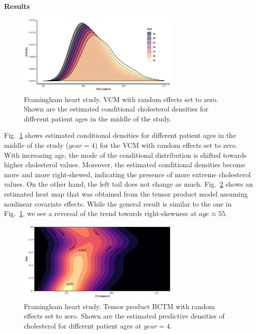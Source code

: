 \documentclass[12pt]{article}
\theoremstyle{plain}
\begin{document}
\noindent\textbf{Results}
\begin{figure}
\centering
   \hspace*{-1.5cm}\includegraphics[width=0.7\textwidth]{figs/fram_densities_vcm2.pdf}\caption{\small Framingham heart study. VCM with random effects set to zero. Shown are the estimated conditional cholesterol densities for different patient ages in the middle of the study.}\label{fig:fram3}
\end{figure}
Fig.~\ref{fig:fram3} shows estimated conditional densities for different patient ages in the middle of the study ($\mathit{year} = 4$) for the VCM with random effects set to zero. With increasing age, the mode of the conditional distribution is shifted towards higher cholesterol values. Moreover, the estimated conditional densities become more and more right-skewed, indicating the presence of more extreme cholesterol values. On the other hand, the left tail does not change as  much. Fig.~\ref{fig:fram4} shows an estimated heat map that was obtained from the tensor product model assuming nonlinear covariate effects. While the general result is similar to the one in Fig.~\ref{fig:fram3}, we see a reversal of the trend towards right-skewness at $\mathit{age}\approx 55$.
\begin{figure}
\centering
     \hspace*{-1.5cm}\includegraphics[width=0.7\textwidth]{figs/fram_contours.pdf}\caption{\small Framingham heart study. Tensor product BCTM with random effects set to zero. Shown are the estimated predictive densities of cholesterol for different patient ages at $\mathit{year}=4$.}\label{fig:fram4}
   \end{figure}
\end{document}
